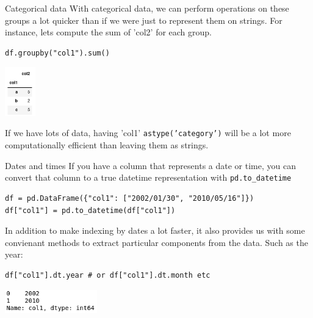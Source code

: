 \documentclass[10pt]{beamer}
\begin{document}
\begin{frame}[label={sec:org581a9b4},fragile]{Categorical data}
 With categorical data, we can perform operations on these groups a lot quicker
than if we were just to represent them on strings. For instance, lets compute
the sum of 'col2' for each group.

\begin{verbatim}
df.groupby("col1").sum()
\end{verbatim}

\begin{center}
\includegraphics[width=0.1\textwidth]{images/categorical.png}
\end{center}

If we have lots of data, having 'col1' \texttt{astype('category')} will be a lot more
computationally efficient than leaving them as strings.
\end{frame}

\begin{frame}[label={sec:org01dcc05},fragile]{Dates and times}
 If you have a column that represents a date or time, you can convert that column
to a true datetime representation with \texttt{pd.to\_datetime}

\begin{verbatim}
df = pd.DataFrame({"col1": ["2002/01/30", "2010/05/16"]})
df["col1"] = pd.to_datetime(df["col1"])
\end{verbatim}

In addition to make indexing by dates a lot faster, it also provides us with
some convienant methods to extract particular components from the data. Such as
the year:

\begin{verbatim}
df["col1"].dt.year # or df["col1"].dt.month etc
\end{verbatim}

\begin{center}
\includegraphics[width=0.3\textwidth]{images/year.png}
\end{center}
\end{frame}
\end{document}
